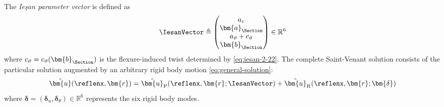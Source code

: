 The \emph{Ieşan parameter vector} is defined as
\begin{equation}
\IesanVector \triangleq \begin{pmatrix} 
a_\varepsilon \\ \bm{a}_\Section \\ a_\vartheta + c_\vartheta \\ \bm{b}_\Section 
\end{pmatrix} \in \mathbb{R}^{6}
\label{eq:def-iesan-params}
\end{equation}
where $c_\vartheta = c_\vartheta(\bm{b}_\Section)$ is the flexure-induced twist 
determined by \eqref{eq:iesan-2-22}. 
%
The complete Saint-Venant solution consists of the particular solution 
augmented by an arbitrary rigid body motion \eqref{eq:general-solution}:
\begin{equation*}
\hat{\bm{u}}(\reflenx, \bm{r}) = \hat{\bm{u}}_{\rm P}(\reflenx, \bm{r}; \IesanVector) 
+ \hat{\bm{u}}_{\rm R}(\reflenx, \bm{r}; \bm{\delta})
\end{equation*}
where $\bm{\delta} = (\bm{\delta}_u, \bm{\delta}_\theta) \in \mathbb{R}^6$ 
represents the six rigid body modes. 
